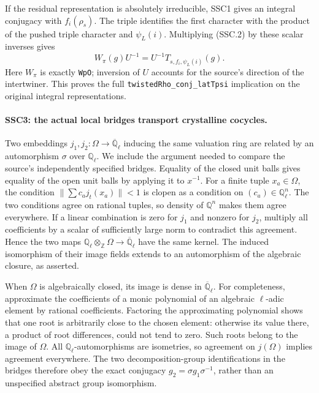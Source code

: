 If the residual representation is absolutely irreducible, SSC1
gives an integral conjugacy with $f_i(\rho_s)$. The triple identifies
the first character with the product of the pushed triple character
and $\psi_L(i)$. Multiplying (SSC.2) by these scalar inverses gives
\[
 W_{\pi}(g)U^{-1}
     =U^{-1}T_{s,f_i,\psi_L(i)}(g).                            \tag{SSC.6}
\]
Here $W_\pi$ is exactly \texttt{WpO}; inversion of $U$ accounts for
the source's direction of the intertwiner. This proves the full
\texttt{twistedRho\_conj\_latTpsi} implication on the original
integral representations.

\paragraph{SSC3: the actual local bridges transport crystalline cocycles.}
\label{claim:SSC3}
Two embeddings $j_1,j_2:\Omega\to\overline{\mathbb Q}_\ell$
inducing the same valuation ring are related by an automorphism
$\sigma$ over $\mathbb Q_\ell$. We include the argument needed
to compare the source's independently specified bridges. Equality
of the closed unit balls gives equality of the open unit balls by
applying it to $x^{-1}$. For a finite tuple $x_a\in\Omega$,
the condition
$\|\sum c_a j_t(x_a)\|<1$ is clopen as a condition on
$(c_a)\in\mathbb Q_\ell^n$. The two conditions agree on rational
tuples, so density of $\mathbb Q^n$ makes them agree everywhere.
If a linear combination is zero for $j_1$ and nonzero for $j_2$,
multiply all coefficients by a scalar of sufficiently large norm
to contradict this agreement. Hence the two maps
$\mathbb Q_\ell\otimes_{\mathbb Z}\Omega\to
\overline{\mathbb Q}_\ell$ have the same kernel. The induced
isomorphism of their image fields extends to an automorphism of
the algebraic closure, as asserted.

When $\Omega$ is algebraically closed, its image is dense in
$\overline{\mathbb Q}_\ell$. For completeness, approximate the
coefficients of a monic polynomial of an algebraic $\ell$-adic
element by rational coefficients. Factoring the approximating
polynomial shows that one root is arbitrarily close to the chosen
element: otherwise its value there, a product of root differences,
could not tend to zero. Such roots belong to the image of
$\Omega$. All $\mathbb Q_\ell$-automorphisms are isometries, so
agreement on $j(\Omega)$ implies agreement everywhere. The two
decomposition-group identifications in the bridges therefore obey
the exact conjugacy
$g_2=\sigma g_1\sigma^{-1}$, rather than an unspecified
abstract group isomorphism.

